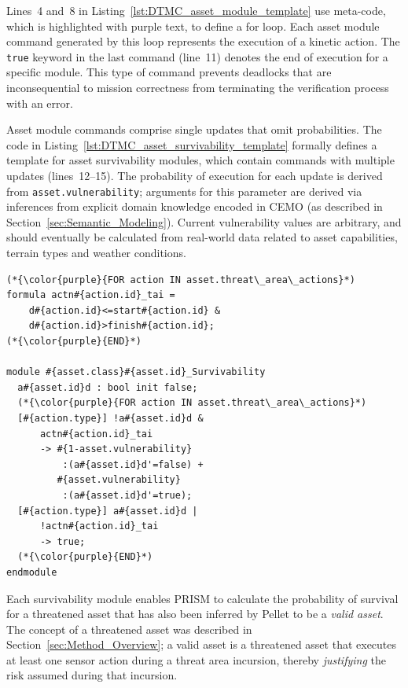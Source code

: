 Lines~4 and~8 in Listing~\ref{lst:DTMC_asset_module_template} use meta-code, which is highlighted with purple text, to define a for loop. Each asset module command generated by this loop represents the execution of a kinetic action. The \texttt{true} keyword in the last command (line~11) denotes the end of execution for a specific module. This type of command prevents deadlocks that are inconsequential to mission correctness from terminating the verification process with an error.

Asset module commands comprise single updates that o\-mit probabilities. The code in Listing~\ref{lst:DTMC_asset_survivability_template} formally defines a template for asset survivability modules, which contain commands with multiple updates (lines~12--15). The probability of execution for each update is derived from \texttt{asset.vulnerability}; arguments for this parameter are derived via inferences from explicit domain knowledge encoded in CEMO (as described in Section~\ref{sec:Semantic_Modeling}). Current vulnerability values are arbitrary, and should eventually be calculated from real-world data related to asset capabilities, terrain types and weather conditions.

\begin{lstlisting}[caption={DTMC template for asset survivability},label=lst:DTMC_asset_survivability_template]
(*{\color{purple}{FOR action IN asset.threat\_area\_actions}*)
formula actn#{action.id}_tai =
    d#{action.id}<=start#{action.id} &
    d#{action.id}>finish#{action.id};
(*{\color{purple}{END}*)

module #{asset.class}#{asset.id}_Survivability
  a#{asset.id}d : bool init false;
  (*{\color{purple}{FOR action IN asset.threat\_area\_actions}*)
  [#{action.type}] !a#{asset.id}d &
      actn#{action.id}_tai
      -> #{1-asset.vulnerability}
          :(a#{asset.id}d'=false) +
         #{asset.vulnerability}
          :(a#{asset.id}d'=true);
  [#{action.type}] a#{asset.id}d |
      !actn#{action.id}_tai
      -> true;
  (*{\color{purple}{END}*)
endmodule
\end{lstlisting}

Each survivability module enables PRISM to calculate the probability of survival for a threatened asset that has also been inferred by Pellet to be a \emph{valid asset}. The concept of a threatened asset was described in Section~\ref{sec:Method_Overview}; a valid asset is a threatened asset that executes at least one sensor action during a threat area incursion, thereby \emph{justifying} the risk assumed during that incursion.

